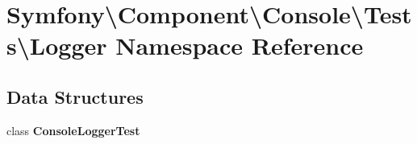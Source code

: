 \section{Symfony\textbackslash{}Component\textbackslash{}Console\textbackslash{}Tests\textbackslash{}Logger Namespace Reference}
\label{namespace_symfony_1_1_component_1_1_console_1_1_tests_1_1_logger}
\subsection*{Data Structures}
\begin{DoxyCompactItemize}
\item 
class {\bf Console\+Logger\+Test}
\end{DoxyCompactItemize}
